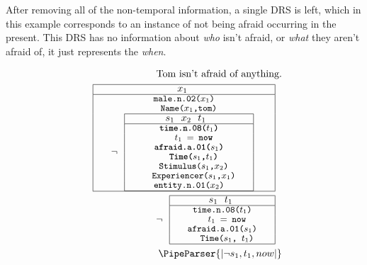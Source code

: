 \documentclass[a4paper,12pt,leqno,twoside]{article}
\def\drs#1#2{
\renewcommand{\arraystretch}{0.8}
\begin{tabular}[c]{|>{\hspace{1pc}}c<{\hspace{1pc}}|}
	\hline #1 \\
	\hline #2 \\
	\hline
\end{tabular}
\renewcommand{\arraystretch}{1}
}
\newcommand{\vph}[1]{\vphantom{#1}}
\newcommand{\ebox}[1]{\fbox{$\vph{'(),}#1$}}
\newcommand{\EventString}[1]{%
	\renewcommand*{\do}[1]{\ebox{##1}}%
	\PipeParser{#1}%
}
\begin{document}
After removing all of the non-temporal information, a single DRS is left, which in this example corresponds to an instance of not being afraid occurring in the present. This DRS has no information about \textit{who} isn't afraid, or \textit{what} they aren't afraid of, it just represents the \textit{when}.

\begingroup
\setlength{\abovedisplayskip}{-10pt}%
\setlength{\belowdisplayskip}{0pt}%
\setlength{\abovedisplayshortskip}{-10pt}%
\setlength{\belowdisplayshortskip}{0pt}%

\begin{subequations}
	\label{ex:drs-example}
	\begin{align}
	\text{Tom isn't afraid of anything.}\label{ex:drs-example-a}\\
	\text{\drs{$x_1$ \hfill}{
		{\small\texttt{male.n.02($x_1$)}}\\
		{\small\texttt{~~Name($x_1$,tom)}}\\
		$\neg{}$ \drs{$s_1$~~$x_2$~~$t_1$~ \hfill}{
			{\small\textbf{\texttt{time.n.08($t_1$)}}}\\
			{\small\textbf{\texttt{~~$t_1$ $=$ now}}}\\
			{\small\textbf{\texttt{afraid.a.01($s_1$)}}}\\
			{\small\textbf{\texttt{~~Time($s_1$,$t_1$)}}}\\
			{\small\texttt{~~Stimulus($s_1$,$x_2$)}}\\
			{\small\texttt{~~Experiencer($s_1$,$x_1$)}}\\
			{\small\texttt{entity.n.01($x_2$)}}
		}
	}}\label{ex:drs-example-b}\\
	\text{$\neg{}$ \drs{$s_1$~~$t_1$ \hfill}{
		{\small\texttt{time.n.08($t_1$)}}\\
		{\small\texttt{~~$t_1$ $=$ now}}\\
		{\small\texttt{afraid.a.01($s_1$)}}\\
		{\small\texttt{~~Time($s_1$, $t_1$)}}
	}}\label{ex:drs-example-c}\\
	\EventString{|\neg{} s_1, t_1, now|}\label{ex:drs-example-d}
	\end{align}
\end{subequations}
\endgroup
\end{document}
